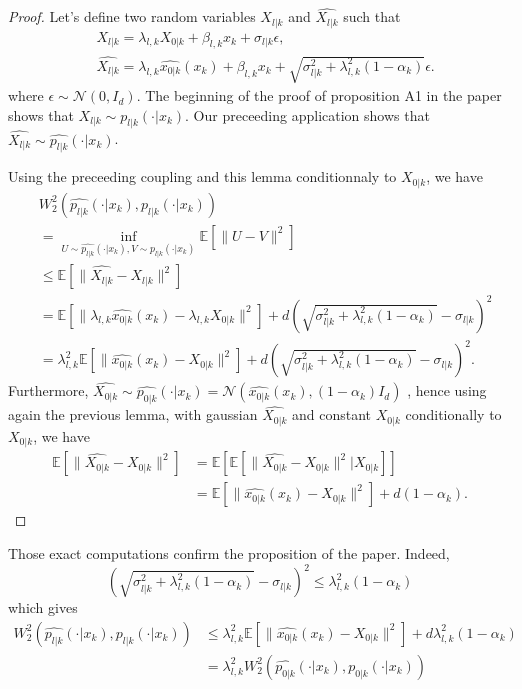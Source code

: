 \documentclass[12pt]{article}
\begin{document}
\begin{proof}
Let's define two random variables $X_{l|k}$ and $\hat{X_{l|k}}$ such that
\begin{align*}
    &X_{l|k} = \lambda_{l,k} X_{0|k} + \beta_{l,k} x_k + \sigma_{l|k} \epsilon, \\
    &\hat{X_{l|k}} = \lambda_{l,k} \hat{x_{0|k}}(x_k) + \beta_{l,k} x_k 
    + \sqrt{\sigma_{l|k}^2 + \lambda_{l,k}^2(1-\alpha_k)} \epsilon.
\end{align*}
where $\epsilon \sim \mathcal{N}(0, I_d)$.
The beginning of the proof of proposition A1 in the paper shows that $X_{l|k} \sim p_{l|k}(\cdot | x_k)$. 
Our preceeding application shows that $\hat{X_{l|k}} \sim \hat{p_{l|k}}(\cdot | x_k)$.

Using the preceeding coupling and this lemma conditionnaly to $X_{0|k}$, we have
\begin{align*}
    &W_2^2(\hat{p_{l|k}}(\cdot | x_k), p_{l|k}(\cdot | x_k))\\
    & = \inf_{U\sim \hat{p_{l|k}}(\cdot | x_k), V \sim p_{l|k}(\cdot | x_k)} \mathbb{E}\left[ \| U - V \|^2 \right] \\
    & \leq
    \mathbb{E}\left[ \| \hat{X_{l|k}} - X_{l|k} \|^2 \right]\\
    & = \mathbb{E}\left[ \| \lambda_{l,k}\hat{x_{0|k}}(x_k) - \lambda_{l,k}X_{0|k} \|^2 \right]
    + d \left( \sqrt{\sigma_{l|k}^2 + \lambda_{l,k}^2(1-\alpha_k)} - \sigma_{l|k} \right)^2 \\
     &= \lambda_{l,k}^2 \mathbb{E}\left[ \| \hat{x_{0|k}}(x_k) - X_{0|k} \|^2 \right]
    + d \left( \sqrt{\sigma_{l|k}^2 + \lambda_{l,k}^2(1-\alpha_k)} - \sigma_{l|k} \right)^2. 
\end{align*} 
Furthermore, $\hat{X_{0|k}} \sim \hat{p_{0|k}}(\cdot | x_k) = \mathcal{N}(\hat{x_{0|k}}(x_k), (1 - \alpha_k) I_d)$
, hence using again the previous lemma, with gaussian $\hat{X_{0|k}}$ and constant $X_{0|k}$ 
conditionally to $X_{0|k}$, we have
\begin{align*}
    \mathbb{E}\left[ \| \hat{X_{0|k}} - X_{0|k} \|^2 \right]
    & = \mathbb{E} \left[ \mathbb{E}\left[ \| \hat{X_{0|k}} - X_{0|k} \|^2 | X_{0|k} \right]\right]\\
    & = \mathbb{E}\left[ \| \hat{x_{0|k}}(x_k) - X_{0|k} \|^2 \right] + d (1-\alpha_k).
\end{align*}
\end{proof}

Those exact computations confirm the proposition of the paper. Indeed, 
$$\left( \sqrt{\sigma_{l|k}^2 + \lambda_{l,k}^2(1-\alpha_k)} - \sigma_{l|k} \right)^2 
\leq \lambda_{l,k}^2 (1-\alpha_k)$$
which gives
\begin{align*}
W_2^2(\hat{p_{l|k}}(\cdot | x_k), p_{l|k}(\cdot | x_k))
& \leq \lambda_{l,k}^2 \mathbb{E} \left[ \| \hat{x_{0|k}}(x_k) - X_{0|k} \|^2 \right] 
+ d \lambda_{l,k}^2 (1-\alpha_k) \\
& = \lambda_{l,k}^2 W_2^2(\hat{p_{0|k}}(\cdot | x_k), p_{0|k}(\cdot | x_k))
\end{align*}
\end{document}

